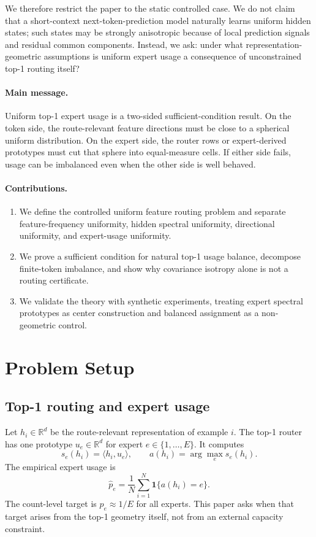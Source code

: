 \documentclass{article}
\begin{document}
We therefore restrict the paper to the static controlled case.  We do not claim
that a short-context next-token-prediction model naturally learns uniform hidden
states; such states may be strongly anisotropic because of local prediction
signals and residual common components.  Instead, we ask: under what
representation-geometric assumptions is uniform expert usage a consequence of
unconstrained top-1 routing itself?

\paragraph{Main message.}
Uniform top-1 expert usage is a two-sided sufficient-condition result.  On the
token side, the route-relevant feature directions must be close to a spherical
uniform distribution.  On the expert side, the router rows or expert-derived
prototypes must cut that sphere into equal-measure cells.  If either side fails,
usage can be imbalanced even when the other side is well behaved.

\paragraph{Contributions.}
\begin{enumerate}
\item We define the controlled uniform feature routing problem and separate
feature-frequency uniformity, hidden spectral uniformity, directional
uniformity, and expert-usage uniformity.
\item We prove a sufficient condition for natural top-1 usage balance, decompose
finite-token imbalance, and show why covariance isotropy alone is not a routing
certificate.
\item We validate the theory with synthetic experiments, treating expert spectral
prototypes as center construction and balanced assignment as a non-geometric
control.
\end{enumerate}

\section{Problem Setup}

\subsection{Top-1 routing and expert usage}

Let $h_i\in\mathbb{R}^d$ be the route-relevant representation of example $i$.
The top-1 router has one prototype $u_e\in\mathbb{R}^d$ for expert
$e\in\{1,\ldots,E\}$.  It computes
\begin{equation}
 s_e(h_i)=\langle h_i,u_e\rangle,
 \qquad
 a(h_i)=\arg\max_e s_e(h_i).
\end{equation}
The empirical expert usage is
\begin{equation}
 \widehat p_e=\frac{1}{N}\sum_{i=1}^N \mathbf{1}\{a(h_i)=e\}.
\end{equation}
The count-level target is $\widehat p_e\approx 1/E$ for all experts.  This paper
asks when that target arises from the top-1 geometry itself, not from an
external capacity constraint.
\end{document}
